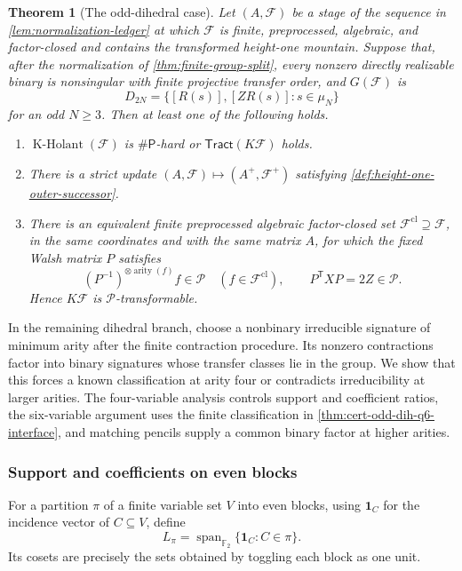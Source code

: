 \documentclass[11pt,letterpaper,onecolumn]{article}
\theoremstyle{plain}
\newtheorem{theorem}{Theorem}[section]
\theoremstyle{definition}
\theoremstyle{remark}
\newcommand{\Ftwo}{\mathbb F_2}
\newcommand{\cF}{\mathcal F}
\newcommand{\cP}{\mathscr P}
\newcommand{\KHolant}{\operatorname{K\text{-}Holant}}
\newcommand{\Tract}{\mathsf{Tract}}
\newcommand{\SharpP}{\#\mathsf P}
\newcommand{\Span}{\operatorname{span}}
\newcommand{\arity}{\operatorname{arity}}
\newcommand{\one}{\mathbf 1}
\begin{document}
	\begin{theorem}[The odd-dihedral case]
		\label{thm:odd-dihedral}
		Let \((A,\cF)\) be a stage of the sequence in
		\cref{lem:normalization-ledger} at which \(\cF\) is finite, preprocessed,
		algebraic, and factor-closed and contains the transformed height-one
		mountain.  Suppose that, after the normalization of
		\cref{thm:finite-group-split}, every nonzero directly realizable binary is
		nonsingular with finite projective transfer order, and
		\(G(\cF)\) is
		\[
		D_{2N}=\{[R(s)],[ZR(s)]:s\in\mu_N\}
		\]
		for an odd \(N\ge3\).
		Then at least one of the following holds.
		\begin{enumerate}
			\item \(\KHolant(\cF)\) is \(\SharpP\)-hard or \(\Tract(K\cF)\) holds.
            \item There is a strict update \((A,\cF)\mapsto(A^+,\cF^+)\)
            satisfying \cref{def:height-one-outer-successor}.
			\item There is an equivalent finite preprocessed algebraic factor-closed
			set \(\cF^{\mathrm{cl}}\supseteq\cF\), in the same
			coordinates and with the same matrix \(A\), for which the fixed
			Walsh matrix \(P\) satisfies
			\[
			(P^{-1})^{\otimes\arity(f)}f\in\cP
			\quad(f\in\cF^{\mathrm{cl}}),
			\qquad
			P^{\mathsf T}XP=2Z\in\cP.
			\]
			Hence \(K\cF\) is \(\cP\)-transformable.
		\end{enumerate}
	\end{theorem}
	
	In the remaining dihedral branch, choose a nonbinary irreducible
signature of minimum arity after the finite contraction procedure. Its
nonzero contractions factor into binary signatures whose transfer classes
lie in the group. We show that this forces a known classification at arity four or contradicts
irreducibility at larger arities. The four-variable analysis controls
support and coefficient ratios, the six-variable argument uses the finite
classification in \cref{thm:cert-odd-dih-q6-interface}, and matching pencils
supply a common binary factor at higher arities.
	
	\subsubsection{Support and coefficients on even blocks}
	\label{subsec:odd-dih-phase-product-class}
	
For a partition \(\pi\) of a finite variable set \(V\) into even blocks,
using \(\one_C\) for the incidence vector of \(C\subseteq V\), define
	\[
	L_\pi=\Span_{\Ftwo}\{\one_C:C\in\pi\}.
	\]
	Its cosets are precisely the sets obtained by toggling each block as one
	unit.
	
\end{document}
